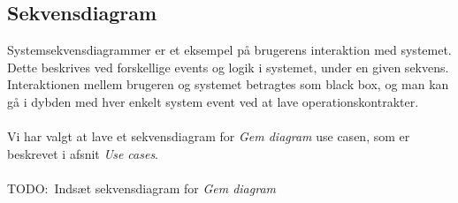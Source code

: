 \subsection{Sekvensdiagram}
Systemsekvensdiagrammer er et eksempel på brugerens interaktion med systemet. Dette beskrives ved forskellige events og logik i systemet, under en given sekvens.
\\
Interaktionen mellem brugeren og systemet betragtes som black box, og man kan gå i dybden med hver enkelt system event ved at lave operationskontrakter.
\\\\
Vi har valgt at lave et sekvensdiagram for \textit{Gem diagram} use casen, som er beskrevet i afsnit \textit{Use cases}.
\\\\
TODO:\ Indsæt sekvensdiagram for \textit{Gem diagram}
